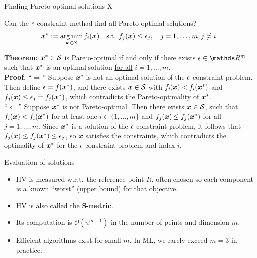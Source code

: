 \documentclass[11pt,compress,t,notes=noshow,xcolor=table]{beamer}
\begin{document}
\begin{framei}{Finding Pareto-optimal solutions X}
\item Can the $\epsilon$-constraint method find all Pareto-optimal solutions?
$$\bm{x}^\ast := \mathop{\mathrm{arg\,min}}_{\bm{x} \in \mathcal{S}} f_i(\bm{x}) \quad \text{s.t. } f_j(\bm{x}) \leq \epsilon_j, \quad j=1,\dots,m, j \neq i.$$
\item \textbf{Theorem:} $\bm{x}^\ast \in \mathcal{S}$ is Pareto-optimal if and only if there exists $\mathbf{\eps} \in \R^m$ such that $\bm{x}^\ast$ is an optimal solution \underline{for all} $i=1,\dots,m$.\\
\spacer
\textbf{Proof.} ``$\Rightarrow$'' Suppose $\bm{x}^\ast$ is not an optimal solution of the $\epsilon$-constraint problem. Then define $\mathbf{\epsilon}=f(\bm{x}^\ast)$, and there exists $\bm{x} \in \mathcal{S}$ with $f_i(\bm{x}) <f_i(\bm{x}^\ast)$ and $f_j(\bm{x}) \leq \epsilon_j = f_j(\bm{x}^\ast)$, which contradicts the Pareto-optimality of $\bm{x}^\ast$.\\
``$\Leftarrow$'' Suppose $\bm{x}^\ast$ is not Pareto-optimal. Then there exists $\bm{x} \in \mathcal{S}$, such that $f_i(\bm{x}) < f_i(\bm{x}^\ast)$ for at least one $i \in \{1, \dots, m\}$ and $f_j(\bm{x}) \leq f_j(\bm{x}^\ast)$ for all $j = 1, \dots, m$.
Since $\bm{x}^\ast$ is a solution of the $\epsilon$-constraint problem, it follows that $f_j(\bm{x}) \leq f_j(\bm{x}^\ast) \leq \epsilon_j$, so $\bm{x}$ satisfies the constraints, which contradicts the optimality of $\bm{x}^\ast$ for the $\epsilon$-constraint problem and index $i$.
\end{framei}


\begin{framev}[fs=small]{Evaluation of solutions}
\begin{itemize}
\item HV is measured w.r.t.\ the reference point $R$, often chosen so each
component is a known ``worst'' (upper bound) for that objective.
\item HV is also called the \textbf{S-metric}.
\item Its computation is $\mathcal{O}(n^{m-1})$ in the number of points
and dimension $m$.
\item Efficient algorithms exist for small $m$.
In ML, we rarely exceed $m=3$ in practice.
\end{itemize}
\end{framev}

\endlecture
\end{document}
